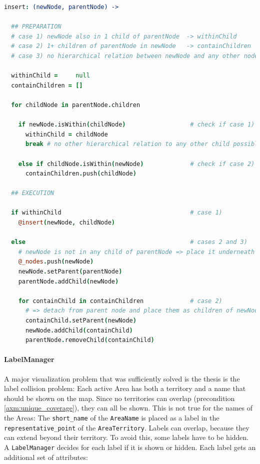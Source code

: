 \begin{center}
\begin{minipage}[t]{0.8\textwidth}
\begin{lstlisting}[language=coffeescript,
  caption=Insertion of a polygon node into the Within-Tree,
  label=lst:within_tree_insertion]
insert: (newNode, parentNode) ->

  ## PREPARATION
  # case 1) newNode also in 1 child of parentNode  -> withinChild
  # case 2) 1+ children of parentNode in newNode   -> containChildren
  # case 3) no hierarchical relation between newNode and any other node

  withinChild =     null
  containChildren = []

  for childNode in parentNode.children

    if newNode.isWithin(childNode)                  # check if case 1)
      withinChild = childNode
      break # no other hierarchical relation to any other child possible

    else if childNode.isWithin(newNode)             # check if case 2)
      containChildren.push(childNode)

  ## EXECUTION

  if withinChild                                    # case 1)
    @insert(newNode, childNode)

  else                                              # cases 2 and 3)
    # newNode is not in any child of parentNode => place it underneath
    @_nodes.push(newNode)
    newNode.setParent(parentNode)
    parentNode.addChild(newNode)

    for containChild in containChildren             # case 2)
      # => detach from parent node and place them as children of newNode
      containChild.setParent(newNode)
      newNode.addChild(containChild)
      parentNode.removeChild(containChild)
\end{lstlisting}
\end{minipage}
\end{center}


\paragraph{LabelManager} %
\label{par:labelmanager}

A major visualization problem that was sufficiently solved is the thesis is the label collision problem: Each active Area has both a territory and a name that should be shown on the map. Since no territories can overlap (precondition \ref{axm:unique_coverage}), they can all be shown. This is not true for the names of the Areas: The \texttt{short\_name} of the \texttt{AreaName} is placed as a label in the \texttt{representative\_point} of the \texttt{AreaTerritory}. Labels can overlap, because they can extend beyond their territory. To avoid this, some labels have to be hidden. A \texttt{LabelManager} decides for each label if it is shown or hidden. Each label gets an additional set of attributes:


